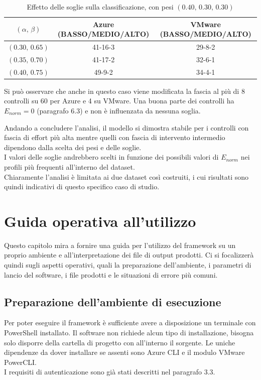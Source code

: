 \documentclass[a4paper,11pt]{report}
\begin{document}
\begin{table}[H]
\centering
\small
\begin{tabular}{c|c|c}
\hline
$(\alpha,\,\beta)$ & Azure (BASSO/MEDIO/ALTO) & VMware (BASSO/MEDIO/ALTO) \\
\hline
$(0.30,\,0.65)$ & 41-16-3 & 29-8-2 \\ \hline
$(0.35,\,0.70)$ & 41-17-2 & 32-6-1 \\  \hline
$(0.40,\,0.75)$ & 49-9-2 & 34-4-1 \\  
\hline
\end{tabular}
\caption{Effetto delle soglie sulla classificazione, con pesi $(0.40,\,0.30,\,0.30)$}
\label{tab:sens-soglie}
\end{table}

Si può osservare che anche in questo caso viene modificata la fascia al più di 8 controlli su 60 per Azure e 4 su VMware. Una buona parte dei controlli ha $E_{norm}=0$ (paragrafo 6.3) e non è influenzata da nessuna soglia.

Andando a concludere l'analisi, il modello si dimostra stabile per i controlli con fascia di effort più alta mentre quelli con fascia di intervento intermedio dipendono dalla scelta dei pesi e delle soglie.\\
I valori delle soglie andrebbero scelti in funzione dei possibili valori di $E_{norm}$ nei profili più frequenti all'interno del dataset.\\
Chiaramente l'analisi è limitata ai due dataset così costruiti, i cui risultati sono quindi indicativi di questo specifico caso di studio.

\chapter{Guida operativa all'utilizzo}

Questo capitolo mira a fornire una guida per l'utilizzo del framework su un proprio ambiente e all'interpretazione dei file di output prodotti.
Ci si focalizzerà quindi sugli aspetti operativi, quali la preparazione dell'ambiente, i parametri di lancio del software, i file prodotti e le situazioni di errore più comuni.

\section{Preparazione dell'ambiente di esecuzione}

Per poter eseguire il framework è sufficiente avere a disposizione un terminale con PowerShell installato.
Il software non richiede alcun tipo di installazione, bisogna solo disporre della cartella di progetto con all'interno il sorgente. Le uniche dipendenze da dover installare se assenti sono Azure CLI e il modulo VMware PowerCLI.\\
I requisiti di autenticazione sono già stati descritti nel paragrafo 3.3.
\end{document}
